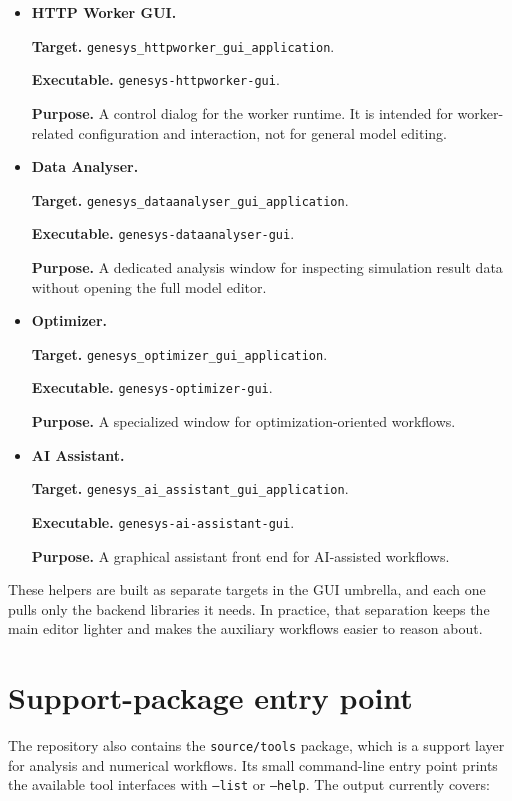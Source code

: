 \begin{itemize}
\item \textbf{HTTP Worker GUI.}

\noindent\textbf{Target.} \texttt{genesys\_httpworker\_gui\_application}.

\noindent\textbf{Executable.} \texttt{genesys-httpworker-gui}.

\noindent\textbf{Purpose.} A control dialog for the worker runtime. It is intended for worker-related configuration and interaction, not for general model editing.

\item \textbf{Data Analyser.}

\noindent\textbf{Target.} \texttt{genesys\_dataanalyser\_gui\_application}.

\noindent\textbf{Executable.} \texttt{genesys-dataanalyser-gui}.

\noindent\textbf{Purpose.} A dedicated analysis window for inspecting simulation result data without opening the full model editor.

\item \textbf{Optimizer.}

\noindent\textbf{Target.} \texttt{genesys\_optimizer\_gui\_application}.

\noindent\textbf{Executable.} \texttt{genesys-optimizer-gui}.

\noindent\textbf{Purpose.} A specialized window for optimization-oriented workflows.

\item \textbf{AI Assistant.}

\noindent\textbf{Target.} \texttt{genesys\_ai\_assistant\_gui\_application}.

\noindent\textbf{Executable.} \texttt{genesys-ai-assistant-gui}.

\noindent\textbf{Purpose.} A graphical assistant front end for AI-assisted workflows.
\end{itemize}

These helpers are built as separate targets in the GUI umbrella, and each one
pulls only the backend libraries it needs. In practice, that separation keeps
the main editor lighter and makes the auxiliary workflows easier to reason
about.

\section{Support-package entry point}

The repository also contains the \texttt{source/tools} package, which is a
support layer for analysis and numerical workflows. Its small command-line
entry point prints the available tool interfaces with \texttt{--list} or
\texttt{--help}. The output currently covers:

